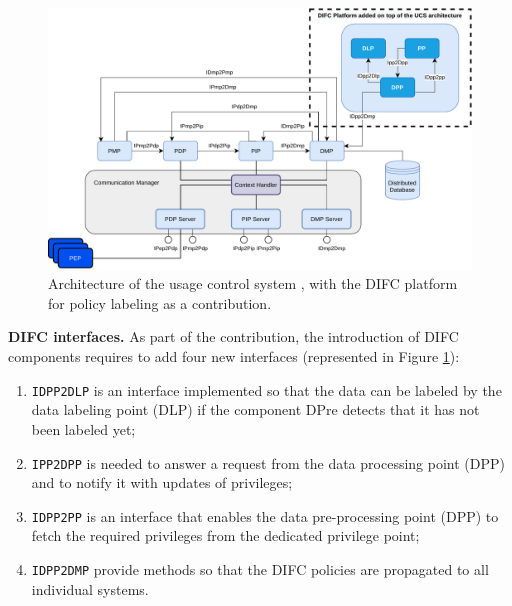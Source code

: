  \begin{figure}[t]
 \centering
 \includegraphics[width=\columnwidth]{Images/Kelbert_architecture_DIFC_enhanced.pdf}
 \caption{Architecture of the usage control system \cite{Kelbert2018}, with the DIFC platform for policy labeling as a contribution.}
\label{F_Kelbert_architecture_DIFC_enhanced}
\end{figure}

\textbf{DIFC interfaces.} As part of the contribution, the introduction of DIFC components requires to add four new interfaces (represented in Figure \ref{F_Kelbert_architecture_DIFC_enhanced}):
\begin{enumerate}
    \item \texttt{IDPP2DLP} is an interface implemented so that the data can be labeled by the data labeling point (DLP) if the component DPre detects that it has not been labeled yet;
    \item \texttt{IPP2DPP} is needed to answer a request from the data processing point (DPP) and to notify it with updates of privileges;
    \item \texttt{IDPP2PP} is an interface that enables the data pre-processing point (DPP) to fetch the required privileges from the dedicated privilege point; 
    \item \texttt{IDPP2DMP} provide methods so that the DIFC policies are propagated to all individual systems.
\end{enumerate}


